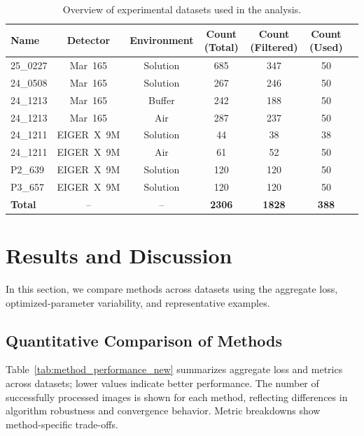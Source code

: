 \documentclass[11pt,onecolumn]{IEEEtran}
\begin{document}
\begin{table}[t]
\caption{Overview of experimental datasets used in the analysis.}
\label{tab:datasets}
\centering
\small
\setlength{\tabcolsep}{4pt}
\renewcommand{\arraystretch}{1.0}
\begin{tabular}{@{}lcccccc@{}}
\toprule
Name & Detector & Environment & Count (Total) & Count (Filtered) & Count (Used) \\ \midrule
25\_0227 & Mar~165 & Solution & 685 & 347 & 50 \\
24\_0508 & Mar~165 & Solution & 267 & 246 & 50 \\
24\_1213 & Mar~165 & Buffer & 242 & 188 & 50 \\
24\_1213 & Mar~165 & Air & 287 & 237 & 50 \\
24\_1211 & EIGER~X~9M & Solution & 44 & 38 & 38 \\
24\_1211 & EIGER~X~9M & Air & 61 & 52 & 50 \\
P2\_639 & EIGER~X~9M & Solution & 120 & 120 & 50 \\
P3\_657 & EIGER~X~9M & Solution & 120 & 120 & 50 \\ \midrule
\textbf{Total} & -- & -- & \textbf{2306} & \textbf{1828} & \textbf{388} \\
\bottomrule
\end{tabular}
\end{table}




\section{Results and Discussion}

In this section, we compare methods across datasets using the aggregate loss, optimized-parameter variability, and representative examples.

\subsection{Quantitative Comparison of Methods}

Table~\ref{tab:method_performance_new} summarizes aggregate loss and metrics across datasets; lower values indicate better performance. The number of successfully processed images is shown for each method, reflecting differences in algorithm robustness and convergence behavior. Metric breakdowns show method-specific trade-offs.
\end{document}
